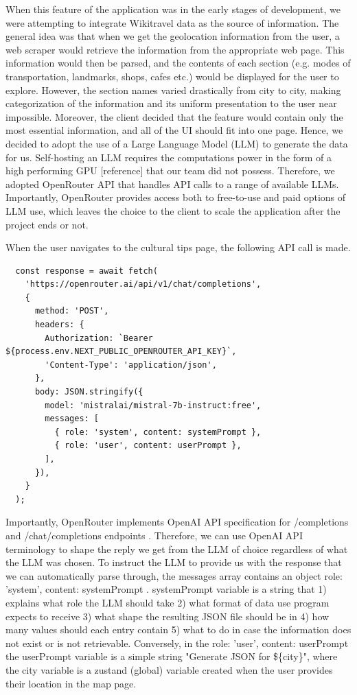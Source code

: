 When this feature of the application was in the early stages of development, we were attempting to integrate Wikitravel data as the source of information. The general idea was that when we get the geolocation information from the user, a web scraper would retrieve the information from the appropriate web page. This information would then be parsed, and the contents of each section (e.g. modes of transportation, landmarks, shops, cafes etc.) would be displayed for the user to explore. However, the section names varied drastically from city to city, making categorization of the information and its uniform presentation to the user near impossible. Moreover, the client decided that the feature would contain only the most essential information, and all of the UI should fit into one page. Hence, we decided to adopt the use of a Large Language Model (LLM) to generate the data for us.  Self-hosting an LLM requires the computations power in the form of a high performing GPU [reference] that our team did not possess. Therefore, we adopted OpenRouter API that handles API calls to a range of available LLMs. Importantly, OpenRouter provides access both to free-to-use and paid options of LLM use, which leaves the choice to the client to scale the application after the project ends or not.  

When the user navigates to the cultural tips page, the following API call is made. 
\begin{verbatim} 
  const response = await fetch(
    'https://openrouter.ai/api/v1/chat/completions',
    {
      method: 'POST',
      headers: {
        Authorization: `Bearer ${process.env.NEXT_PUBLIC_OPENROUTER_API_KEY}`,
        'Content-Type': 'application/json',
      },
      body: JSON.stringify({
        model: 'mistralai/mistral-7b-instruct:free',
        messages: [
          { role: 'system', content: systemPrompt },
          { role: 'user', content: userPrompt },
        ],
      }),
    }
  );
\end{verbatim}
Importantly, OpenRouter implements OpenAI API specification for /completions and /chat/completions endpoints \cite{noauthor_openrouter_nodate}. Therefore, we can use OpenAI API terminology \cite{openAI_explanation_onHowToUseTheirApi} to shape the reply we get from the LLM of choice regardless of what the LLM was chosen. To instruct the LLM to provide us with the response that we can automatically parse through, the messages array contains an object { role: 'system', content: systemPrompt }. systemPrompt variable is a string that 1) explains what role the LLM should take 2) what format of data use program expects to receive 3) what shape the resulting JSON file should be in 4) how many values should each entry contain 5) what to do in case the information does not exist or is not retrievable. Conversely, in the { role: 'user', content: userPrompt } the userPrompt variable is a simple string "Generate JSON for \$\{city\}", where the city variable is a zustand (global) variable created when the user provides their location in the map page. 

